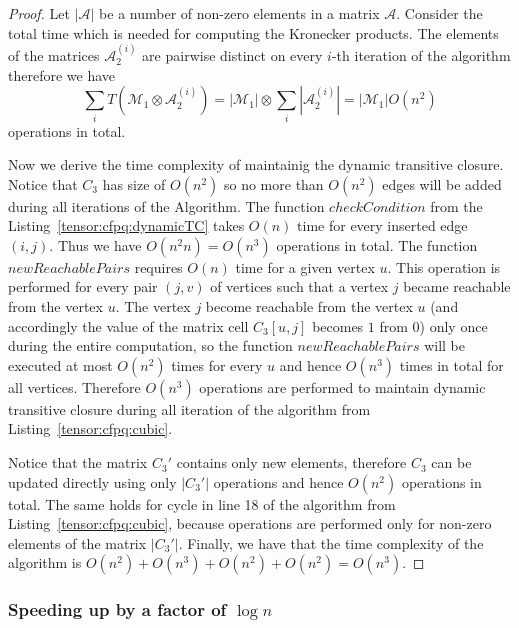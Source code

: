 \begin{proof}
 Let $|\mathcal{A}|$ be a number of non-zero elements in a matrix $\mathcal{A}$. Consider the total time which is needed for computing the Kronecker products. The elements of the matrices $\mathcal{A}_2^{(i)}$ are pairwise distinct on every $i$-th iteration of the algorithm therefore we have 
 $$\sum\limits_i{T(\mathcal{M}_1 \otimes \mathcal{A}_2^{(i)})} = |\mathcal{M}_1| \otimes \sum\limits_i {|\mathcal{A}_2^{(i)}|} = |\mathcal{M}_1|O(n^2)$$
 operations in total. 


Now we derive the time complexity of maintainig the dynamic transitive closure. Notice that $C_3$ has size of $O(n^2)$ so no more than $O(n^2)$ edges will be added during all iterations of the Algorithm. The function $checkCondition$ from the Listing~\ref{tensor:cfpq:dynamicTC} takes $O(n)$ time for every inserted edge $(i, j)$. Thus we have $O(n^2n) = O(n^3)$ operations in total. The function $newReachablePairs$ requires $O(n)$ time for a given vertex $u$. This operation is performed for every pair $(j, v)$ of vertices such that a vertex $j$ became reachable from the vertex $u$. The vertex $j$ become reachable from the vertex $u$ (and accordingly the value of the matrix cell $C_3[u, j]$ becomes $1$ from $0$) only once during the entire computation, so the function $newReachablePairs$ will be executed at most $O(n^2)$ times for every $u$ and hence $O(n^3)$ times in total for all vertices. Therefore $O(n^3)$ operations are performed to maintain dynamic transitive closure during all iteration of the algorithm from Listing~\ref{tensor:cfpq:cubic}.


Notice that the matrix $C_3'$ contains only new elements, therefore $C_3$ can be updated directly using only $|C_3'|$ operations and hence $O(n^2)$ operations in total. The same holds for cycle in line 18 of the algorithm from Listing~\ref{tensor:cfpq:cubic}, because operations are performed only for non-zero elements of the matrix $|C_3'|$. Finally, we have that the time complexity of the algorithm is $O(n^2) + O(n^3) + O(n^2) + O(n^2) = O(n^3)$.
\end{proof}{}

\subsubsection{Speeding up by a factor of $\log n$}

